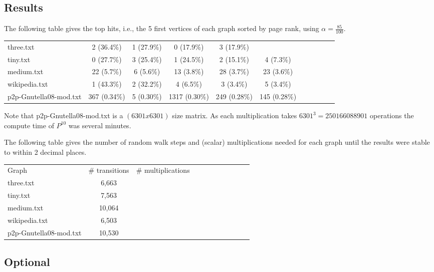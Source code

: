 \documentclass{tufte-handout}
\begin{document}
\subsection{Results}

The following table gives the top hits, i.e., the 5 first vertices of
each graph sorted by page rank, using $\alpha = \frac{85}{100}$.

\medskip
\begin{fullwidth}
\small
\begin{tabular}{lcccccccccc}
three.txt & 2 (36.4\%) & 1 (27.9\%) & 0 (17.9\%) & 3 (17.9\%) \\
tiny.txt & 0 (27.7\%) & 3 (25.4\%) & 1 (24.5\%) & 2 (15.1\%) & 4 (7.3\%) \\
medium.txt & 22 (5.7\%) & 6 (5.6\%) & 13 (3.8\%) & 28 (3.7\%) & 23 (3.6\%) \\
wikipedia.txt & 1 (43.3\%) & 2 (32.2\%) & 4 (6.5\%) & 3 (3.4\%) & 5 (3.4\%) \\
p2p-Gnutella08-mod.txt & 367 (0.34\%) & 5 (0.30\%) & 1317 (0.30\%) & 249 (0.28\%) & 145 (0.28\%) \\
\end{tabular}
\end{fullwidth}

\medskip
Note that p2p-Gnutella08-mod.txt is a $(6301x6301)$ size matrix. As each multiplication takes $6301^3 = 250166088901$
operations the compute time of $P^{10}$ was several minutes.

\bigskip The following table gives the number of random walk steps and
(scalar) multiplications needed for each graph until the results were
stable to within 2 decimal places.

\medskip
\begin{fullwidth}
\small
\begin{tabular}{lcccccccccc}
Graph & \# transitions  & \# multiplications \\
three.txt & 6,663 \\
tiny.txt  & 7,563 \\
medium.txt & 10,064\\
wikipedia.txt & 6,503 \\
p2p-Gnutella08-mod.txt & 10,530
\end{tabular}
\end{fullwidth}

\subsection{Optional}
\end{document}
